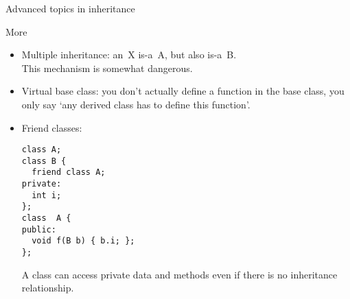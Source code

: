  {Advanced topics in inheritance}

\begin{block}{More}
  \label{sl:obj-more}  
  \begin{itemize}
  \item  Multiple inheritance: an~X is-a~A, but also is-a~B.\\
    This mechanism is somewhat dangerous.
  \item Virtual base class: you don't actually define a function in
    the base class, you only say `any derived class has to define this
    function'.
  \item Friend classes:
\begin{lstlisting}
class A;
class B {
  friend class A;
private:
  int i;
};
class  A {
public: 
  void f(B b) { b.i; };
};
\end{lstlisting}
  A  class can access private data and methods
  even if there is no inheritance relationship.
  \end{itemize}
\end{block}

